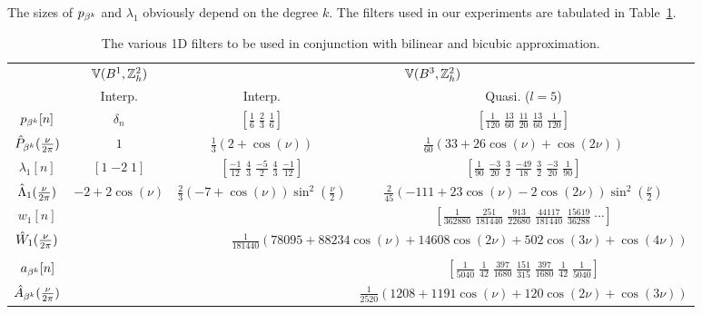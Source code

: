 The sizes of $p_{\cbs^k}$ and $\lambda_1$ obviously depend on the degree
$k$. The filters used in our experiments are tabulated in
Table~\ref{tab:filters}.

\begin{table}[t!]
  \footnotesize
  \caption[Poisson filters for the Cartesian lattice]{The various 1D filters to
  be used in conjunction with bilinear and bicubic approximation.}
  \label{tab:filters}
  \centering
  \begin{tabular}{cc|cc}
    \toprule
     & $\aspace{\ints^2_h}{\tpbs^1}$ & \multicolumn{2}{c}{$\aspace{\ints^2_h}{\tpbs^3}$}\\
     & Interp. & Interp. & Quasi. ($l=5$)\\
    \midrule
    $p_{\cbs^k}[n]$ & $\delta_n$ & $[\tfrac{1}{6}\; \tfrac{2}{3}\; \tfrac{1}{6}]$& $[\tfrac{1}{120}\; \tfrac{13}{60}\; \tfrac{11}{20}\; \tfrac{13}{60}\; \tfrac{1}{120}]$\\
    $\ft{P}_{\cbs^k}(\tfrac{\nu}{2\pi})$ & $1$ & $\tfrac{1}{3}(2 + \cos(\nu))$&
    $\tfrac{1}{60}(33+26\cos(\nu) + \cos(2\nu))$\\
    \midrule
    $\lambda_1[n]$ & $[1\; {-2}\; 1]$ & $[\tfrac{-1}{12}\; \tfrac{4}{3}\;
    \tfrac{-5}{2}\; \tfrac{4}{3}\; \tfrac{-1}{12}]$& $[\tfrac{1}{90}\; \tfrac{-3}{20}\; \tfrac{3}{2}\; \tfrac{-49}{18}\; \tfrac{3}{2}\; \tfrac{-3}{20}\; \tfrac{1}{90}]$\\
    $\ft{\Lambda}_1(\tfrac{\nu}{2\pi})$ & $-2 + 2\cos(\nu)$&
    $\tfrac{2}{3}(-7+\cos(\nu))\sin^2(\tfrac{\nu}{2})$& $\tfrac{2}{45}(-111 + 23\cos(\nu) - 2\cos(2\nu))\sin^2(\tfrac{\nu}{2})$\\
    \midrule
    $w_1[n]$ & & & $[\tfrac{1}{362880}\; \tfrac{251}{181440}\;
    \tfrac{913}{22680}\; \tfrac{44117}{181440}\; \tfrac{15619}{36288}\; \cdots]$\\
    $\ft{W}_1(\tfrac{\nu}{2\pi})$ & &
    \multicolumn{2}{r}{$\scriptscriptstyle{\tfrac{1}{181440}(78095 + 88234\cos(\nu) + 14608\cos(2\nu) + 502\cos(3\nu)+ \cos(4\nu))}$}\\
    & & & \\
    $a_{\cbs^k}[n]$ & & & $[\tfrac{1}{5040}\; \tfrac{1}{42}\;
    \tfrac{397}{1680}\; \tfrac{151}{315}\; \tfrac{397}{1680}\; \tfrac{1}{42}\; \tfrac{1}{5040}]$\\
    $\ft{A}_{\cbs^k}(\tfrac{\nu}{2\pi})$ & & & $\scriptscriptstyle{\tfrac{1}{2520}(1208 + 1191\cos(\nu) + 120\cos(2\nu) + \cos(3\nu))}$\\
    \bottomrule
  \end{tabular}
\end{table}

